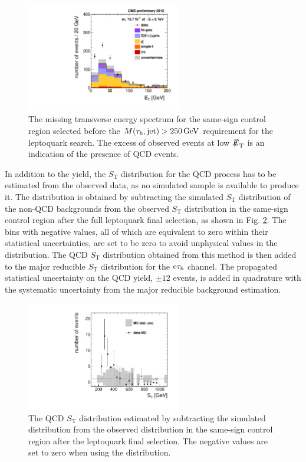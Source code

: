 \documentclass[12pt]{thesis}  %
\newcommand{\tauh}{\ensuremath{\tau_{\text{h}}}\xspace}
\newcommand{\Pe}{\ensuremath{\cmsSymbolFace{e}}\xspace}
\newcommand{\etau}{\ensuremath{\Pe\tauh}\xspace}
\def\eslash{\ensuremath{{\hbox{$E$\kern-0.6em\lower-.05ex\hbox{/}\kern0.10em}}}}
\def\met{\mbox{$\eslash_\text{T}$}\xspace} %
\def\ST{\ensuremath{S_{\text{T}}}\xspace}
\def\MassTJ{\ensuremath{M(\tauh,\text{jet})}\xspace}
\begin{document}
\begin{figure}[hbt]
  \begin{center}
    \includegraphics[width=0.6\textwidth]{figures/etau/metPtSSIso.pdf}
    \caption{The missing transverse energy spectrum for the same-sign control region selected before the $\MassTJ>250\GeV$ requirement for the leptoquark search. The excess of observed events at low \met is an indication of the presence of QCD events.}
    \label{fig:QCDSSMET}
  \end{center}
\end{figure}

In addition to the yield, the \ST distribution for the QCD process has to be estimated from the observed data, as no simulated sample is available to produce it. The distribution is obtained by subtracting the simulated \ST distribution of the non-QCD backgrounds from the observed \ST distribution in the same-sign control region after the full leptoquark final selection, as shown in Fig. \ref{fig:residQCD}. The bins with negative values, all of which are equivalent to zero within their statistical uncertainties, are set to be zero to avoid unphysical values in the distribution. The QCD \ST distribution obtained from this method is then added to the major reducible \ST distribution for the \etau channel. The propagated statistical uncertainty on the QCD yield, $\pm 12$ events, is added in quadrature with the systematic uncertainty from the major reducible background estimation.

\begin{figure}[hbt]
  \begin{center}
    \includegraphics[width=0.6\textwidth]{figures/bkgEstim/residualQCD.pdf}
    \caption{The QCD \ST distribution estimated by subtracting the simulated distribution from the observed distribution in the same-sign control region after the leptoquark final selection. The negative values are set to zero when using the distribution.}
    \label{fig:residQCD}
  \end{center}
\end{figure}
\end{document}
